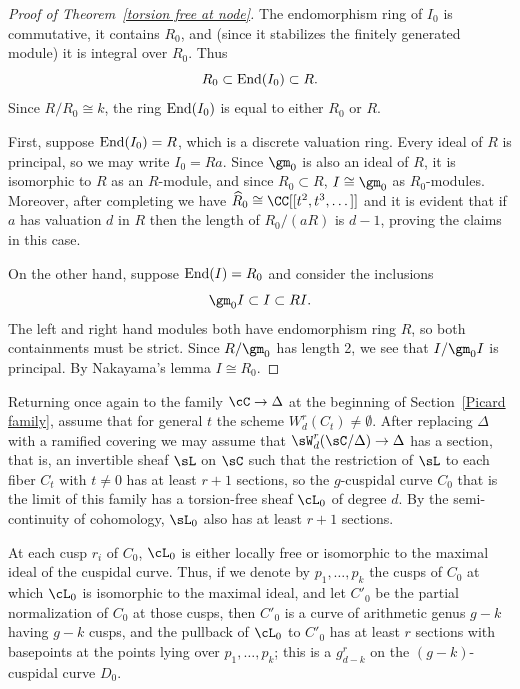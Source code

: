 \begin{proof}[Proof of Theorem~\ref{torsion free at node}] 

\def\End{{\rm End}}

The endomorphism ring of $I_0$ is commutative, it contains $R_0$,  and (since it stabilizes the finitely
generated module) it is integral over $R_0$. Thus
$$
R_0 \subset \End(I_0) \subset R.
$$
Since
$R/R_0 \cong k$, the ring $\End(I_0)$ is equal to either 
$R_0$ or $R$. 

First, suppose
$\End(I_{0})=R$, which is a discrete valuation ring. Every ideal of $R$ is principal, so we may write $I_{0} = Ra$.
 Since $\gm_0$ is also an ideal of $R$, it is isomorphic to $R$
as an $R$-module, and since $R_0\subset R$,
$I \cong \gm_0$ as $R_0$-modules. Moreover, after completing we have $\widehat R_{0} \cong \CC[[t^{2}, t^{3}, \dots]]$ and it is evident that if $a$ has valuation $d$ in $R$ then the length of $R_{0}/(aR)$ is $d-1$, proving the claims in this case.

On the other hand, suppose
$\End(I)=R_0$
 and consider the inclusions
$$
\gm_0 I \subset I \subset R I.
$$
The left and right hand modules both have endomorphism ring $R$,
so both containments must be strict. Since $R/\gm_0$ has length 2,
we see that $I/\gm_0 I$ is principal. By Nakayama's lemma $I\cong R_0$.
\end{proof}

Returning once again to the family $\cC \to \Delta$ at the beginning of Section~\ref{Picard family}, assume that for general $t$ the scheme $W^{r}_{d}(C_t)\neq \emptyset$. After replacing $\Delta$ with a ramified covering
we may assume that $\sW^{r}_{d}(\sC/\Delta) \to \Delta$ has a section, that is, an invertible sheaf $\sL$ on $\sC$
 such that the restriction of $\sL$ to each fiber $C_{t}$ with $t\neq 0$ has at least $r+1$ sections, so the $g$-cuspidal curve $C_0$ that is the limit of this family has a torsion-free sheaf $\cL_0$ of degree $d$. By the semi-continuity
 of cohomology, $\sL_{0}$ also has at least $r+1$ sections. 

At each cusp $r_i$ of $C_0$, $\cL_0$ is either locally free or isomorphic to the maximal ideal of the cuspidal curve. Thus, if we denote by $p_1,\dots, p_k$ the cusps of $C_0$ at which $\cL_0$ is isomorphic to the maximal ideal, and let $C'_{0}$ be the partial normalization of $C_0$ at those cusps, then $C'_{0}$ is a curve of arithmetic genus $g-k$ having $g-k$ cusps, and the pullback of $\cL_0$ to $C'_{0}$ has at least $r$ sections with basepoints at the points lying over $p_1,\dots,p_k$;  this is a $g^r_{d-k}$ on the $(g-k)$-cuspidal curve  $D_0$.



